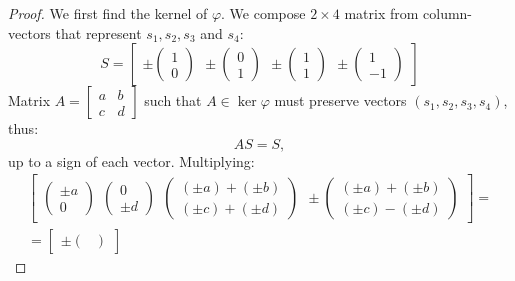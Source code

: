 \documentclass{article}
\theoremstyle{definition}
\begin{document}
\begin{proof}

We first find the kernel of $\varphi$.
We compose $2 \times 4$ matrix from column-vectors that represent $s_1, s_2, s_3$ and $s_4$:
\[  S =
    \begin{bmatrix}
        \pm \begin{pmatrix}
            1 \\ 0
        \end{pmatrix} \>\>
        \pm \begin{pmatrix}
            0 \\ 1
        \end{pmatrix} \>\>
        \pm \begin{pmatrix}
            1 \\ 1
        \end{pmatrix} \>\>
        \pm \begin{pmatrix}
            1 \\ -1
        \end{pmatrix}
    \end{bmatrix}
\]
Matrix 
$
    A =
    \begin{bmatrix}
    a & b \\
    c & d
    \end{bmatrix}
$
such that $A \in \ker \varphi$ must preserve vectors $(s_1,s_2,s_3,s_4)$, thus:
\[ AS = S, \]
up to a sign of each vector. Multiplying:
\begin{multline*}
    \begin{bmatrix}
        \begin{pmatrix}
            \pm a \\ 0
        \end{pmatrix} \>\>
        \begin{pmatrix}
            0 \\ \pm d
        \end{pmatrix} \>\>
        \begin{pmatrix}
            (\pm a) + (\pm b) \\  (\pm c) + (\pm d)
        \end{pmatrix} \>\>
        \pm \begin{pmatrix}
            (\pm a) + (\pm b) \\  (\pm c) - (\pm d)
        \end{pmatrix}
    \end{bmatrix}
    = \\ =
    \begin{bmatrix}
        \pm \begin{pmatrix}

\end{pmatrix}
\end{bmatrix}
\end{multline*}
\end{proof}
\end{document}
